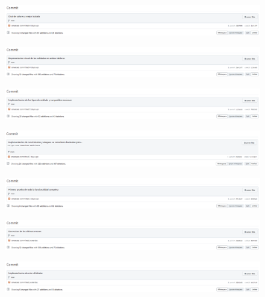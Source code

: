 \documentclass{article}
\begin{document}
\begin{figure}[H]
	\centering
	\includegraphics[width=1\textwidth,keepaspectratio]{img/commit_21.png}
\end{figure}
\begin{figure}[H]
	\centering
	\includegraphics[width=1\textwidth,keepaspectratio]{img/commit_22.png}
\end{figure}
\begin{figure}[H]
	\centering
	\includegraphics[width=1\textwidth,keepaspectratio]{img/commit_23.png}
\end{figure}
\begin{figure}[H]
	\centering
	\includegraphics[width=1\textwidth,keepaspectratio]{img/commit_24.png}
\end{figure}
\begin{figure}[H]
	\centering
	\includegraphics[width=1\textwidth,keepaspectratio]{img/commit_25.png}
\end{figure}
\begin{figure}[H]
	\centering
	\includegraphics[width=1\textwidth,keepaspectratio]{img/commit_26.png}
\end{figure}
\begin{figure}[H]
	\centering
	\includegraphics[width=1\textwidth,keepaspectratio]{img/commit_27.png}
\end{figure}
\end{document}
